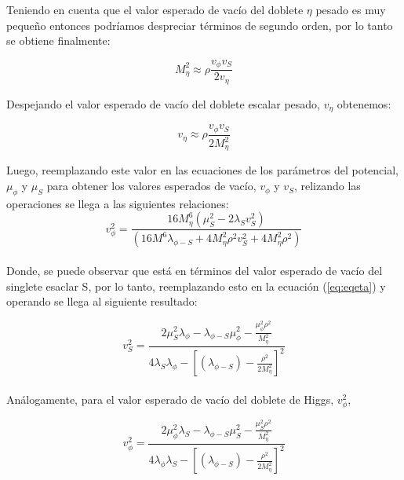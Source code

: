 \documentclass[12pt]{article}
\begin{document}
Teniendo en cuenta que el valor esperado de vacío del doblete $\eta$ pesado es muy pequeño entonces podríamos despreciar términos de segundo orden, por lo tanto se obtiene finalmente: 


 \begin{equation}
      \label{eq:mass2prim2}
      M^{2}_\eta  \approx  \rho \frac{v_\phi v_S }{2v_\eta}
 \end{equation}

Despejando el valor esperado de vacío del doblete escalar pesado, $v_\eta$ obtenemos:

 \begin{equation}
      \label{eq:ma1s2}
      v_\eta  \approx  \rho \frac{v_\phi v_S }{2M^{2}_\eta}
 \end{equation}
 
Luego, reemplazando este valor en las ecuaciones de los parámetros del potencial,  $\mu_\phi$ y $\mu_S$ para obtener los  valores esperados de vacío,  $v_\phi$ y $v_S$, relizando las operaciones se llega a las siguientes relaciones: \\

\begin{equation}
    \label{eq:v_phi}
    v^{2}_\phi=\frac{16M^{6}_\eta(\mu^{2}_S-2\lambda_Sv^{2}_S)}{(16M^{6}\lambda_{\phi-S}+4M^{2}_\eta\rho^{2}v^{2}_S+ 4M^{2}_\eta\rho^{2})}
\end{equation}\\

Donde, se puede observar que está en términos del valor esperado de vacío del singlete esaclar S, por lo tanto, reemplazando esto en la ecuación (\ref{eq:eqeta}) y operando se llega al siguiente resultado:  

\begin{equation}
    \label{eq:valoresperadoS}
    v^{2}_S= \frac{2\mu^{2}_S\lambda_\phi-{\lambda_{\phi-S}}\mu^{2}_\phi-\frac{\mu^{2}_\phi\rho^{2}}{M^{2}_\eta}}{4\lambda_S\lambda_\phi-[({\lambda_{\phi-S}})-\frac{\rho^{2}}{2M^{2}_\eta}]^{2}} 
\end{equation} \\

Análogamente, para el valor esperado de vacío del doblete de Higgs, $v_\phi^{2}$, 

\begin{equation}
    \label{eq:valoresperadoPHI}
    v^{2}_\phi= \frac{2\mu^{2}_\phi\lambda_S-{\lambda_{\phi-S}}\mu^{2}_S-\frac{\mu^{2}_S\rho^{2}}{M^{2}_\eta}}{4\lambda_\phi\lambda_S-[({\lambda_{\phi-S}})-\frac{\rho^{2}}{2M^{2}_\eta}]^{2}} 
\end{equation} \\
\end{document}
